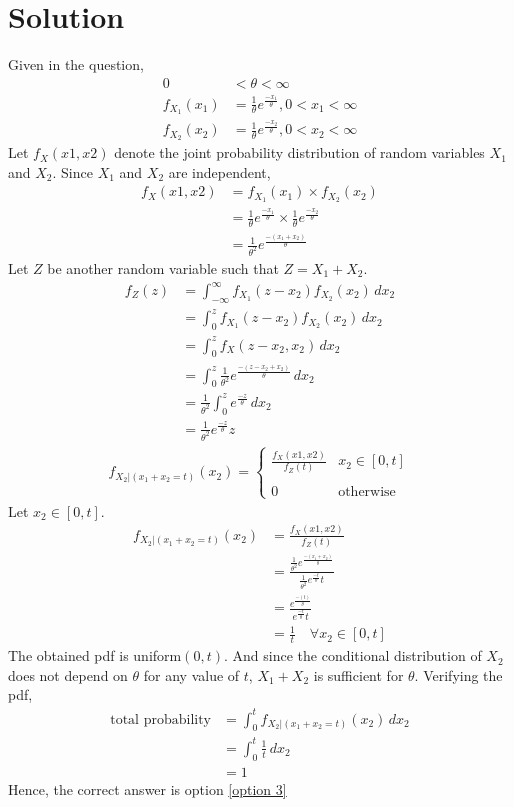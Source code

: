 \documentclass[journal,12pt,twocolumn]{IEEEtran}
\begin{document}
\section*{Solution}
Given in the question,
\begin{align}
    0 &< \theta < \infty
    \\f_{X_1}(x_1) &= \frac{1}{\theta}e^{\frac{-x_1}{\theta}}, 0<x_1<\infty
    \\f_{X_2}(x_2) &= \frac{1}{\theta}e^{\frac{-x_2}{\theta}}, 0<x_2<\infty
\end{align}
Let $f_X(x1,x2)$ denote the joint probability distribution of random variables $X_1$ and $X_2$. Since $X_1$ and $X_2$ are independent, 
\begin{align}
f_X(x1,x2) &= f_{X_1}(x_1) \times f_{X_2}(x_2)
    \\&= \frac{1}{\theta}e^{\frac{-x_1}{\theta}} \times \frac{1}{\theta}e^{\frac{-x_2}{\theta}}
    \\&= \frac{1}{\theta^2}e^{\frac{-(x_1+x_2)}{\theta}}
\end{align}
Let $Z$ be another random variable such that $Z=X_1+X_2$.
\begin{align}
    f_Z(z) &=  \int_{-\infty}^{\infty} f_{X_1}(z-x_2)f_{X_2}(x_2) \,dx_2 
    \\&= \int_{0}^{z} f_{X_1}(z-x_2)f_{X_2}(x_2) \,dx_2
    \\&= \int_{0}^{z} f_X(z-x_2, x_2) \,dx_2
    \\&= \int_{0}^{z} \frac{1}{\theta^2}e^{\frac{-(z-x_2+x_2)}{\theta}} \,dx_2
    \\&= \frac{1}{\theta^2}\int_{0}^{z} e^{\frac{-z}{\theta}} \,dx_2
    \\&= \frac{1}{\theta^2}e^{\frac{-z}{\theta}}z
\end{align}
\begin{align}
    f_{X_2|(x_1+x_2=t)}(x_2) = 
    \begin{cases}
    \frac{f_X(x1,x2)}{f_Z(t)} &  x_2 \in [0, t]\\ ~\\[-1em]
    0 & \text{otherwise}
    \end{cases}
\end{align}
Let $ x_2 \in [0, t]$.
\begin{align}
    f_{X_2|(x_1+x_2=t)}(x_2) &= \frac{f_X(x1,x2)}{f_Z(t)}
    \\&= \frac{\frac{1}{\theta^2}e^{\frac{-(x_1+x_2)}{\theta}}}{\frac{1}{\theta^2}e^{\frac{-t}{\theta}}t}
    \\&= \frac{e^{\frac{-(t)}{\theta}}}{e^{\frac{-t}{\theta}}t}
    \\&= \frac{1}{t} \quad \forall x_2 \in [0, t]
\end{align}
The obtained pdf is uniform$(0,t)$. And since the conditional distribution of $X_2$ does not depend on $\theta$ for any value of $t$, $X_1+X_2$ is sufficient for $\theta$. Verifying the pdf,
\begin{align}
    \text{total probability} &= \int_{0}^{t} f_{X_2|(x_1+x_2=t)}(x_2) \,dx_2
    \\&= \int_{0}^{t} \frac{1}{t} \,dx_2
    \\&= 1
\end{align}
Hence, the correct answer is option \eqref{option 3}
\end{document}
